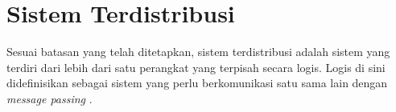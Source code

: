\section{Sistem Terdistribusi}
\label{sec:sistem-terdistribusi}

Sesuai batasan yang telah ditetapkan, sistem terdistribusi adalah sistem yang terdiri dari lebih dari satu perangkat yang terpisah secara logis. Logis di sini didefinisikan sebagai sistem yang perlu berkomunikasi satu sama lain dengan \textit{message passing} \parencite{coulouris2012distributed}.


